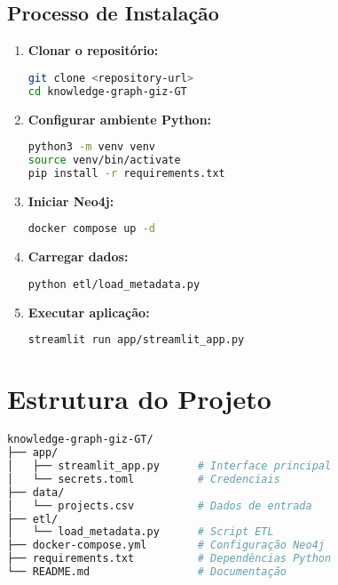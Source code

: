 \documentclass[12pt,a4paper]{article}
\begin{document}
\subsection{Processo de Instalação}

\begin{enumerate}
    \item \textbf{Clonar o repositório:}
    \begin{lstlisting}[language=bash]
git clone <repository-url>
cd knowledge-graph-giz-GT
    \end{lstlisting}
    
    \item \textbf{Configurar ambiente Python:}
    \begin{lstlisting}[language=bash]
python3 -m venv venv
source venv/bin/activate
pip install -r requirements.txt
    \end{lstlisting}
    
    \item \textbf{Iniciar Neo4j:}
    \begin{lstlisting}[language=bash]
docker compose up -d
    \end{lstlisting}
    
    \item \textbf{Carregar dados:}
    \begin{lstlisting}[language=bash]
python etl/load_metadata.py
    \end{lstlisting}
    
    \item \textbf{Executar aplicação:}
    \begin{lstlisting}[language=bash]
streamlit run app/streamlit_app.py
    \end{lstlisting}
\end{enumerate}

\section{Estrutura do Projeto}

\begin{lstlisting}[language=bash, caption=Organização de Diretórios]
knowledge-graph-giz-GT/
├── app/
│   ├── streamlit_app.py      # Interface principal
│   └── secrets.toml          # Credenciais
├── data/
│   └── projects.csv          # Dados de entrada
├── etl/
│   └── load_metadata.py      # Script ETL
├── docker-compose.yml        # Configuração Neo4j
├── requirements.txt          # Dependências Python
└── README.md                 # Documentação
\end{lstlisting}
\end{document}
